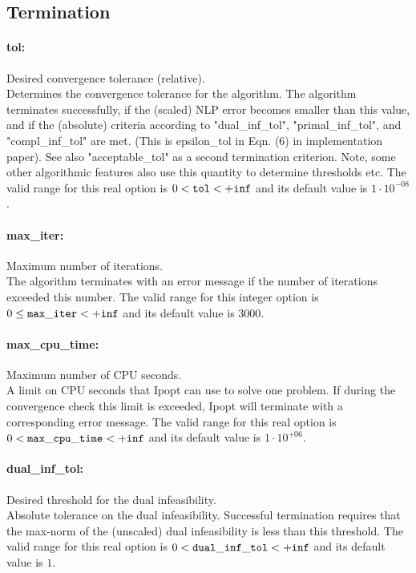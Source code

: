 \subsection{Termination}

\paragraph{tol:}\label{opt:tol} Desired convergence tolerance (relative). \\
 Determines the convergence tolerance for the
algorithm.  The algorithm terminates
successfully, if the (scaled) NLP error becomes
smaller than this value, and if the (absolute)
criteria according to "dual\_inf\_tol",
"primal\_inf\_tol", and "compl\_inf\_tol" are
met.  (This is epsilon\_tol in Eqn. (6) in
implementation paper).  See also
"acceptable\_tol" as a second termination
criterion.  Note, some other algorithmic features
also use this quantity to determine thresholds
etc. The valid range for this real option is 
$0 <  {\tt tol } <  {\tt +inf}$
and its default value is $1 \cdot 10^{-08}$.


\paragraph{max\_iter:}\label{opt:max_iter} Maximum number of iterations. \\
 The algorithm terminates with an error message if
the number of iterations exceeded this number. The valid range for this integer option is
$0 \le {\tt max\_iter } <  {\tt +inf}$
and its default value is $3000$.


\paragraph{max\_cpu\_time:}\label{opt:max_cpu_time} Maximum number of CPU seconds. \\
 A limit on CPU seconds that Ipopt can use to
solve one problem.  If during the convergence
check this limit is exceeded, Ipopt will
terminate with a corresponding error message. The valid range for this real option is 
$0 <  {\tt max\_cpu\_time } <  {\tt +inf}$
and its default value is $1 \cdot 10^{+06}$.


\paragraph{dual\_inf\_tol:}\label{opt:dual_inf_tol} Desired threshold for the dual infeasibility. \\
 Absolute tolerance on the dual infeasibility.
Successful termination requires that the max-norm
of the (unscaled) dual infeasibility is less than
this threshold. The valid range for this real option is 
$0 <  {\tt dual\_inf\_tol } <  {\tt +inf}$
and its default value is $1$.


